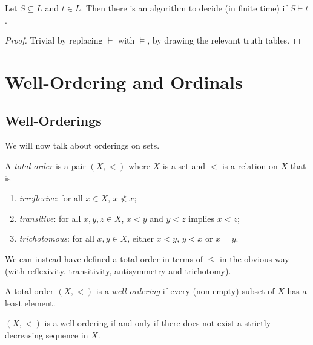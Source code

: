 \documentclass[a3paper, 10pt]{article}
\renewcommand{\vocab}[1]{\emph{#1}}
\begin{document}
\begin{multicols*}{5}
\begin{theorem}[Decidability]
  Let $S \subseteq L$ and $t \in L$. Then there is an algorithm to decide (in finite time) if $S \vdash t$.
\end{theorem}
\begin{proof}
  Trivial by replacing $\vdash$ with $\models$, by drawing the relevant truth tables.
\end{proof}


\section{Well-Ordering and Ordinals}

\subsection{Well-Orderings}

We will now talk about orderings on sets.

\begin{definition}
  A \vocab{total order} is a pair $(X, <)$ where $X$ is a set and $<$ is a relation on $X$ that is
  \begin{enumerate}
    \item \emph{irreflexive}: for all $x \in X$, $x \not< x$;
    \item \emph{transitive}: for all $x, y, z \in X$, $x < y$ and $y < z$ implies $x < z$;
    \item \emph{trichotomous}: for all $x, y \in X$, either $x < y$, $y < x$ or $x = y$. 
  \end{enumerate}
\end{definition}

We can instead have defined a total order in terms of $\leq$ in the obvious way (with reflexivity, transitivity, antisymmetry and trichotomy). 

\begin{definition}
  A total order $(X, <)$ is a \vocab{well-ordering} if every (non-empty) subset of $X$ has a least element.
\end{definition}


\begin{proposition}
  $(X, <)$ is a well-ordering if and only if there does not exist a strictly decreasing sequence in $X$.
\end{proposition}


\end{multicols*}
\end{document}
